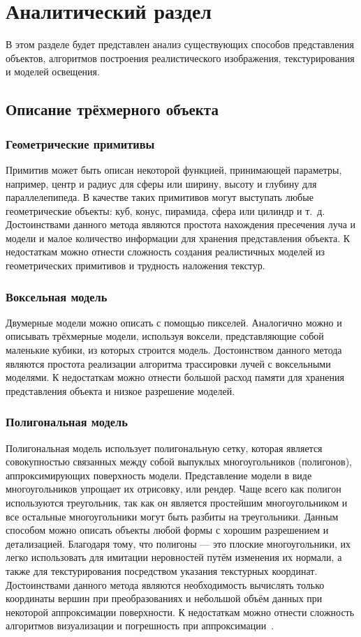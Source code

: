 \chapter{Аналитический раздел}

В этом разделе будет представлен анализ существующих способов представления объектов, алгоритмов построения реалистического изображения, текстурирования и моделей освещения.

\section{Описание трёхмерного объекта}

\subsection{Геометрические примитивы}
Примитив может быть описан некоторой функцией, принимающей параметры, например, центр и радиус для сферы или ширину, высоту и глубину для параллелепипеда. В качестве таких примитивов могут выступать любые геометрические объекты: куб, конус, пирамида, сфера или цилиндр и т.~д. Достоинствами данного метода являются простота нахождения пресечения луча и модели и малое количество информации для хранения представления объекта. К недостаткам можно отнести сложность создания реалистичных моделей из геометрических примитивов и трудность наложения текстур.

\subsection{Воксельная модель}
Двумерные модели можно описать с помощью пикселей. Аналогично можно и описывать трёхмерные модели, используя воксели, представляющие собой маленькие кубики, из которых строится модель. Достоинством данного метода являются простота реализации алгоритма трассировки лучей с воксельными моделями. К недостаткам можно отнести большой расход памяти для хранения представления объекта и низкое разрешение моделей.

\subsection{Полигональная модель}
Полигональная модель использует полигональную сетку, которая является совокупностью связанных между собой выпуклых многоугольников (полигонов), аппроксимирующих поверхность модели. Представление модели в виде многоугольников упрощает их отрисовку, или рендер. Чаще всего как полигон используются треугольник, так как он является простейшим многоугольником и все остальные многоугольники могут быть разбиты на треугольники. Данным способом можно описать объекты любой формы с хорошим разрешением и детализацией. Благодаря тому, что полигоны --- это плоские многоугольники, их легко использовать для имитации неровностей путём изменения их нормали, а также для текстурирования посредством указания текстурных координат. Достоинствами данного метода являются необходимость вычислять только координаты вершин при преобразованиях и небольшой объём данных при некоторой аппроксимации поверхности. К недостаткам можно отнести сложность алгоритмов визуализации и погрешность при аппроксимации~\cite{data}.

